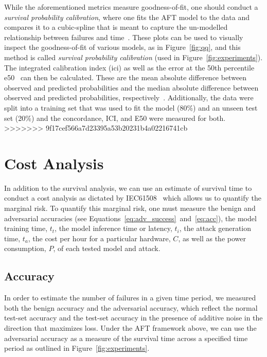\documentclass[sn-mathphys-num]{sn-jnl}%
\begin{document}
While the aforementioned metrics measure goodness-of-fit, one should conduct a \textit{survival probability calibration}, where one fits the AFT model to the data and compares it to a cubic-spline that is meant to capture the un-modelled relationship between failures and time~\cite{ici}. These plots can be used to visually inspect the goodness-of-fit of various models, as in Figure~\ref{fig:qq}, and this method is called \textit{survival probability calibration} (used in Figure~\ref{fig:experiments}).
The integrated calibration index (\acrshort{ici}) as well as the error at the 50th percentile \acrshort{e50}~\cite{ici} can then be calculated. 
These are the mean absolute difference between observed and predicted probabilities and the median absolute difference between observed and predicted probabilities, respectively~\cite{ici}. 
Additionally, the data were split into a training set that was used to fit the model (80\%) and an unseen test set (20\%) and the concordance, ICI, and E50 were measured for both.
>>>>>>> 9f17cef566a7d23395a53b20231b4a02216741cb






\section{Cost Analysis}
\label{cost}

In addition to the survival analysis, we can use an estimate of survival time to conduct a cost analysis as dictated by IEC61508~\cite{IEC61508} which allows us to quantify the marginal risk. To quantify this marginal risk, one must measure the benign and adversarial accuracies (see Equations~\ref{eq:adv_success}~and~\ref{eq:acc}), the model training time, $t_{t}$, the model inference time or latency, $t_{i}$, the attack generation time, $t_{a}$, the cost per hour for a particular hardware, $C$, as well as the power consumption, $P$, of each tested model and attack.


\subsection{Accuracy}

In order to estimate the number of failures in a given time period, we measured both the benign accuracy and the adversarial accuracy, which reflect the normal test-set accuracy and the test-set accuracy in the presence of additive noise in the direction that maximizes loss. Under the AFT framework above, we can use the adversarial accuracy as a measure of the survival time across a specified time period as outlined in Figure~\ref{fig:experiments}.
\end{document}
